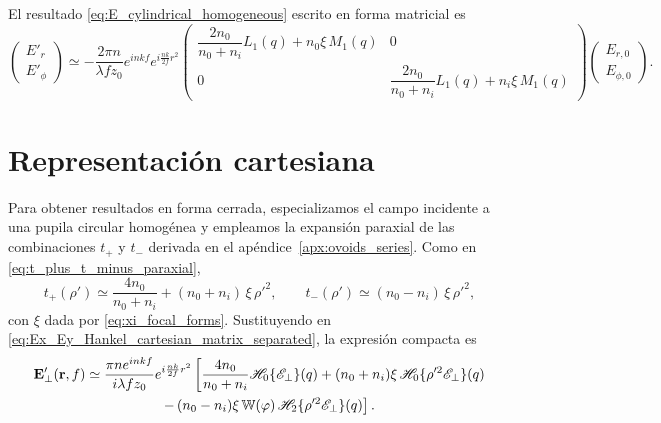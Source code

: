 El resultado \eqref{eq:E_cylindrical_homogeneous} escrito en forma matricial es
\begin{equation}
\begin{pmatrix}
E'_r\\
E'_\phi
\end{pmatrix}
\simeq
-\frac{2\pi n}{\lambda f z_0}
e^{inkf}
e^{i\frac{nk}{2f}r^2}
\begin{pmatrix}
\dfrac{2n_0}{n_0+n_i}L_1(q)+n_0\xi\,M_1(q) & 0
\\[0.8em]
0 & \dfrac{2n_0}{n_0+n_i}L_1(q)+n_i\xi\,M_1(q)
\end{pmatrix}
\begin{pmatrix}
E_{r,0}\\
E_{\phi,0}
\end{pmatrix}.
\label{eq:E_cylindrical_homogeneous_matrix}
\end{equation}

\section{Representación cartesiana}

Para obtener resultados en forma cerrada, especializamos el campo incidente a una pupila circular homogénea y empleamos la expansión paraxial de las combinaciones $t_+$ y $t_-$ derivada en el apéndice~\ref{apx:ovoids_series}. Como en \eqref{eq:t_plus_t_minus_paraxial},
\begin{equation}
t_+(\rho')
\simeq
\frac{4n_0}{n_0+n_i}
+
(n_0+n_i)\,\xi\,\rho'^2,
\qquad
t_-(\rho')
\simeq
(n_0-n_i)\,\xi\,\rho'^2,
\label{eq:t_plus_t_minus_paraxial_cartesian}
\end{equation}
con $\xi$ dada por \eqref{eq:xi_focal_forms}. Sustituyendo en \eqref{eq:Ex_Ey_Hankel_cartesian_matrix_separated}, la expresión compacta es
\begin{equation}
\begin{aligned}
\vb E'_\perp(\vb r,f)
\simeq{}&
\frac{\pi n e^{inkf}}{i\lambda f z_0}
e^{i\frac{nk}{2f}r^2}
\left[
\frac{4n_0}{n_0+n_i}
\mathscr H_0\{\mathscr E_\perp\}(q)
+
(n_0+n_i)\xi\,
\mathscr H_0\{\rho'^2\mathscr E_\perp\}(q)
\right.
\\
&\qquad\qquad
\left.
-\,
(n_0-n_i)\xi\,
\mathbb W(\varphi)\,
\mathscr H_2\{\rho'^2\mathscr E_\perp\}(q)
\right].
\end{aligned}
\label{eq:E_field_cartesian_paraxial}
\end{equation}

